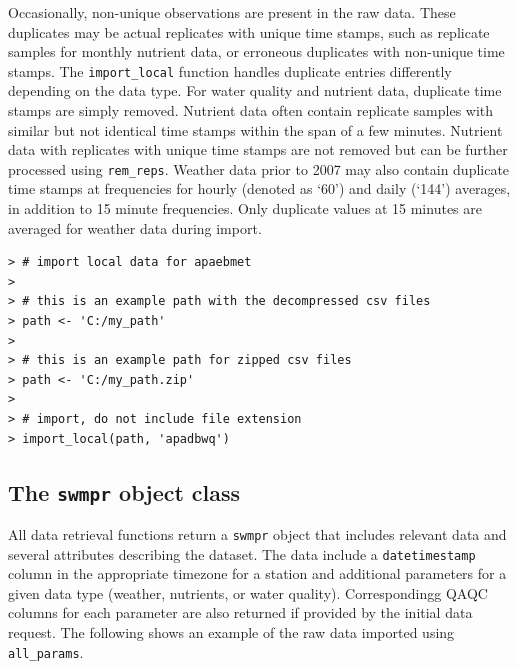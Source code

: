 \documentclass[10pt,letterpaper]{article}\usepackage[]{graphicx}\usepackage[]{color}
\makeatletter
\newenvironment{kframe}{%
 \def\at@end@of@kframe{}%
 \ifinner\ifhmode%
  \def\at@end@of@kframe{\end{minipage}}%
  \begin{minipage}{\columnwidth}%
 \fi\fi%
 \def\FrameCommand##1{\hskip\@totalleftmargin \hskip-\fboxsep
 \colorbox{shadecolor}{##1}\hskip-\fboxsep
     \hskip-\linewidth \hskip-\@totalleftmargin \hskip\columnwidth}%
 \MakeFramed {\advance\hsize-\width
   \@totalleftmargin\z@ \linewidth\hsize
   \@setminipage}}%
 {\par\unskip\endMakeFramed%
 \at@end@of@kframe}
\newenvironment{knitrout}{}{} %
\makeatother
\begin{document}
Occasionally, non-unique observations are present in the raw data.  These duplicates may be actual replicates with unique time stamps, such as replicate samples for monthly nutrient data, or erroneous duplicates with non-unique time stamps.  The \texttt{import\_local} function handles duplicate entries differently depending on the data type.  For water quality and nutrient data, duplicate time stamps are simply removed.  Nutrient data often contain replicate samples with similar but not identical time stamps within the span of a few minutes.  Nutrient data with replicates with unique time stamps are not removed but can be further processed using \texttt{rem\_reps}.  Weather data prior to 2007 may also contain duplicate time stamps at frequencies for hourly (denoted as `60') and daily (`144') averages, in addition to 15 minute frequencies.  Only duplicate values at 15 minutes are averaged for weather data during import.  

\begin{knitrout}\small
{}\color{fgcolor}\begin{kframe}
\begin{verbatim}
> # import local data for apaebmet
> 
> # this is an example path with the decompressed csv files
> path <- 'C:/my_path'
> 
> # this is an example path for zipped csv files
> path <- 'C:/my_path.zip'
> 
> # import, do not include file extension
> import_local(path, 'apadbwq') 
\end{verbatim}
\end{kframe}
\end{knitrout}

\subsection*{The \texttt{swmpr} object class}

All data retrieval functions return a \texttt{swmpr} object that includes relevant data and several attributes describing the dataset.  The data include a \texttt{datetimestamp} column in the appropriate timezone for a station and additional parameters for a given data type (weather, nutrients, or water quality).  Correspondingg \gls{QAQC} columns for each parameter are also returned if provided by the initial data request.  The following shows an example of the raw data imported using \texttt{all\_params}.
\end{document}
